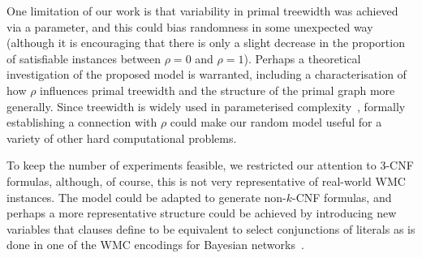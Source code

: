 \documentclass[runningheads]{llncs}
\begin{document}
One limitation of our work is that variability in primal treewidth was achieved
via a parameter, and this could bias randomness in some unexpected way (although
it is encouraging that there is only a slight decrease in the proportion of
satisfiable instances between $\rho=0$ and $\rho = 1$). Perhaps a theoretical
investigation of the proposed model is warranted, including a characterisation
of how $\rho$ influences primal treewidth and the structure of the primal graph
more generally. Since treewidth is widely used in parameterised
complexity~\cite{DBLP:series/txcs/DowneyF13}, formally establishing a connection
with $\rho$ could make our random model useful for a variety of other hard
computational problems.

To keep the number of experiments feasible, we restricted our attention to 3-CNF
formulas, although, of course, this is not very representative of real-world
\textsf{WMC} instances. The model could be adapted to generate non-$k$-CNF
formulas, and perhaps a more representative structure could be achieved by
introducing new variables that clauses define to be equivalent to select
conjunctions of literals as is done in one of the \textsf{WMC} encodings for
Bayesian networks~\cite{DBLP:conf/kr/Darwiche02}.






\end{document}
